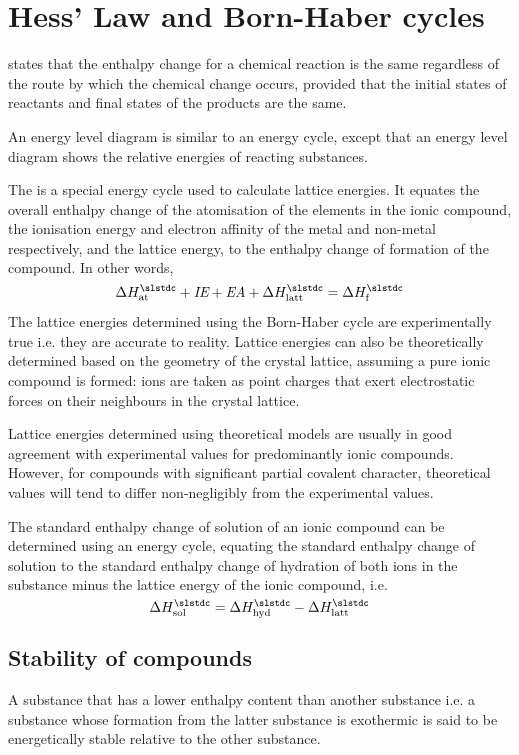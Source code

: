 \documentclass[Chemistry.tex]{subfiles}
\begin{document}
\section{Hess' Law and Born-Haber cycles}
 states that the enthalpy change for a chemical reaction is the same regardless of the route by which the chemical change occurs, provided that the initial states of reactants and final states of the products are the same.

An energy level diagram is similar to an energy cycle, except that an energy level diagram shows the relative energies of reacting substances.

The  is a special energy cycle used to calculate lattice energies. It equates the overall enthalpy change of the atomisation of the elements in the ionic compound, the ionisation energy and electron affinity of the metal and non-metal respectively, and the lattice energy, to the enthalpy change of formation of the compound. In other words, 
\begin{equation}\sldHs{at} + \slIE + \slEA + \sldHs{latt} = \sldHs{f}\end{equation}

The lattice energies determined using the Born-Haber cycle are experimentally true i.e. they are accurate to reality. Lattice energies can also be theoretically determined based on the geometry of the crystal lattice, assuming a pure ionic compound is formed: ions are taken as point charges that exert electrostatic forces on their neighbours in the crystal lattice.

Lattice energies determined using theoretical models are usually in good agreement with experimental values for predominantly ionic compounds. However, for compounds with significant partial covalent character, theoretical values will tend to differ non-negligibly from the experimental values.

The standard enthalpy change of solution of an ionic compound can be determined using an energy cycle, equating the standard enthalpy change of solution to the standard enthalpy change of hydration of both ions in the substance minus the lattice energy of the ionic compound, i.e. \begin{equation}\sldHs{sol} = \sldHs{hyd} - \sldHs{latt}\end{equation}
\subsection{Stability of compounds}
A substance that has a lower enthalpy content than another substance i.e. a substance whose formation from the latter substance is exothermic is said to be energetically stable relative to the other substance.
\end{document}
